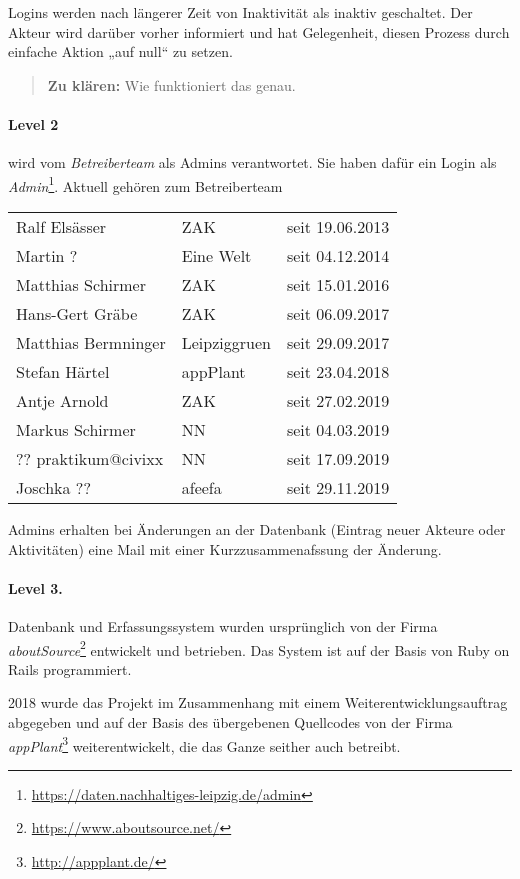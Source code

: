 \documentclass[a4paper,11pt]{article}
\newcommand{\zuklaeren}[1]{\begin{quote} \textbf{Zu klären:} #1 \end{quote}}
\begin{document}
Logins werden nach längerer Zeit von Inaktivität als inaktiv geschaltet.  Der
Akteur wird darüber vorher informiert und hat Gelegenheit, diesen Prozess
durch einfache Aktion „auf null“ zu setzen.

\zuklaeren{Wie funktioniert das genau.}

\paragraph{Level 2}
wird vom \emph{Betreiberteam} als Admins verantwortet. Sie haben dafür ein
Login als
\emph{Admin}\footnote{\url{https://daten.nachhaltiges-leipzig.de/admin}}.
Aktuell gehören zum Betreiberteam
\begin{center}
  \begin{tabular}{llc}
    Ralf Elsässer & ZAK & seit 19.06.2013\\
    Martin ? & Eine Welt & seit 04.12.2014\\
    Matthias Schirmer & ZAK & seit 15.01.2016\\
    Hans-Gert Gräbe & ZAK & seit 06.09.2017\\
    Matthias Bermninger & Leipziggruen & seit 29.09.2017\\
    Stefan Härtel & appPlant & seit 23.04.2018\\
    Antje Arnold & ZAK & seit 27.02.2019\\
    Markus Schirmer & NN & seit 04.03.2019\\
    ?? praktikum@civixx & NN & seit 17.09.2019\\
    Joschka ?? & afeefa & seit 29.11.2019
  \end{tabular}
\end{center}
Admins erhalten bei Änderungen an der Datenbank (Eintrag neuer Akteure oder
Aktivitäten) eine Mail mit einer Kurzzusammenafssung der Änderung.

\paragraph{Level 3.}
Datenbank und Erfassungssystem wurden ursprünglich von der Firma
\emph{aboutSource}\footnote{\url{https://www.aboutsource.net/}} entwickelt und
betrieben.  Das System ist auf der Basis von Ruby on Rails programmiert. 

2018 wurde das Projekt im Zusammenhang mit einem Weiterentwicklungsauftrag
abgegeben und auf der Basis des übergebenen Quellcodes von der Firma
\emph{appPlant}\footnote{\url{http://appplant.de/}} weiterentwickelt, die das
Ganze seither auch betreibt.
\end{document}
